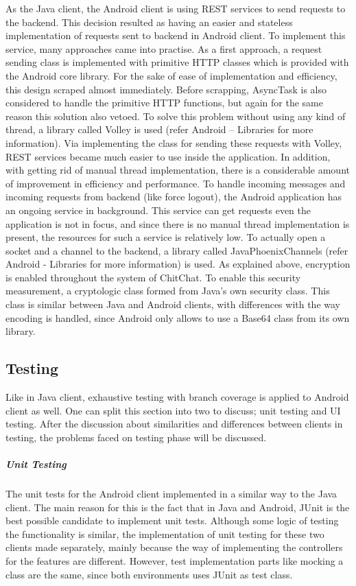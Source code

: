 \documentclass[11pt,a4paper]{report}
\begin{document}
As the Java client, the Android client is using REST services to send requests to the backend. This decision resulted as having an easier and stateless implementation of requests sent to backend in Android client. To implement this service, many approaches came into practise. As a first approach, a request sending class is implemented with primitive HTTP classes which is provided with the Android core library. For the sake of ease of implementation and efficiency, this design scraped almost immediately. Before scrapping, AsyncTask is also considered to handle the primitive HTTP functions, but again for the same reason this solution also vetoed. To solve this problem without using any kind of thread, a library called Volley is used (refer Android – Libraries for more information). Via implementing the class for sending these requests with Volley, REST services became much easier to use inside the application. In addition, with getting rid of manual thread implementation, there is a considerable amount of improvement in efficiency and performance.
To handle incoming messages and incoming requests from backend (like force logout), the Android application has an ongoing service in background. This service can get requests even the application is not in focus, and since there is no manual thread implementation is present, the resources for such a service is relatively low. To actually open a socket and a channel to the backend, a library called JavaPhoenixChannels (refer Android - Libraries for more information) is used.
As explained above, encryption is enabled throughout the system of ChitChat. To enable this security measurement, a cryptologic class formed from Java’s own security class. This class is similar between Java and Android clients, with differences with the way encoding is handled, since Android only allows to use a Base64 class from its own library.

\subsection{Testing}
Like in Java client, exhaustive testing with branch coverage is applied to Android client as well. One can split this section into two to discuss; unit testing and UI testing. After the discussion about similarities and differences between clients in testing, the problems faced on testing phase will be discussed.

\subparagraph{Unit Testing}
The unit tests for the Android client implemented in a similar way to the Java client. The main reason for this is the fact that in Java and Android, JUnit is the best possible candidate to implement unit tests. Although some logic of testing the functionality is similar, the implementation of unit testing for these two clients made separately, mainly because the way of implementing the controllers for the features are different. However, test implementation parts like mocking a class are the same, since both environments uses JUnit as test class.
\end{document}
